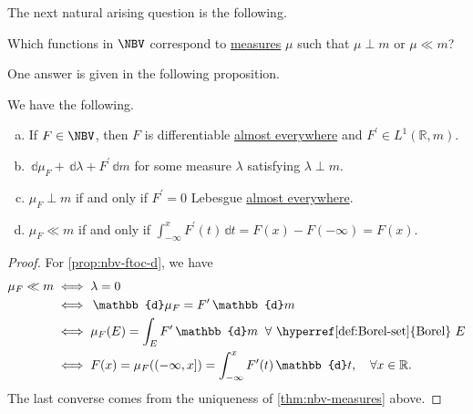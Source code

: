 The next natural arising question is the following.
\begin{problem}
Which functions in \(\NBV\) correspond to \hyperref[def:measure]{measures} \(\mu\) such that \(\mu \perp m\) or \(\mu \ll m\)?
\end{problem}

One answer is given in the following proposition.

\begin{proposition}\label{prop:nbv-ftoc}
	We have the following.
	\begin{enumerate}[(a)]
		\item\label{prop:nbv-ftoc-a} If \(F \in \NBV\), then \(F\) is differentiable \hyperref[def:mu-almost-everywhere]{almost everywhere} and \(F^\prime  \in L^1(\mathbb{R},m)\).
		\item\label{prop:nbv-ftoc-b} \(\,\mathbb{d}\mu_F + \,\mathbb{d}\lambda + F^\prime \,\mathbb{d}m\) for some measure \(\lambda\) satisfying \(\lambda \perp m\).
		\item\label{prop:nbv-ftoc-c} \(\mu_F \perp m\) if and only if \(F^\prime = 0\) Lebesgue \hyperref[def:mu-almost-everywhere]{almost everywhere}.
		\item\label{prop:nbv-ftoc-d} \(\mu_F \ll m\) if and only if \(\int_{-\infty}^x F^\prime (t) \,\mathbb{d}t = F(x) - F(-\infty) = F(x)\).
	\end{enumerate}
\end{proposition}

\begin{proof}
	For \autoref{prop:nbv-ftoc-d}, we have
	\[
		\begin{split}
			\mu_F \ll m
			 & \iff \lambda = 0                                                                                             \\
			 & \iff \,\mathbb{d}\mu_F = F^\prime \,\mathbb{d}m                                                              \\
			 & \iff \mu_F(E) = \int_E F^\prime  \,\mathbb{d}m \;\; \forall \text{ \hyperref[def:Borel-set]{Borel} } E       \\
			 & \iff F(x) = \mu_F((-\infty,x]) = \int_{-\infty}^x F^\prime (t) \,\mathbb{d}t,\quad \forall x \in \mathbb{R}.
		\end{split}
	\]
	The last converse comes from the uniqueness of \autoref{thm:nbv-measures} above.
\end{proof}